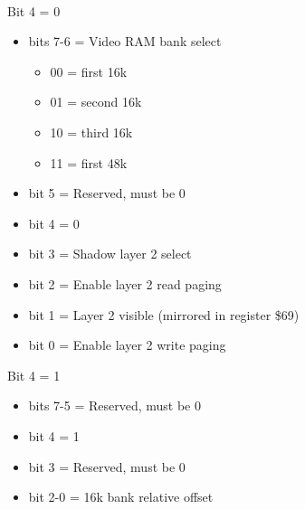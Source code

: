 \\
Bit 4 = 0
\begin{itemize}
\item[] bits 7-6 = Video RAM bank select
  \begin{itemize}
  \item[] 00 = first 16k
  \item[] 01 = second 16k
  \item[] 10 = third 16k
  \item[] 11 = first 48k
  \end{itemize}
\item[] bit 5 = Reserved, must be 0
\item[] bit 4 = 0
\item[] bit 3 = Shadow layer 2 select
\item[] bit 2 = Enable layer 2 read paging
\item[] bit 1 = Layer 2 visible (mirrored in register \$69)
\item[] bit 0 = Enable layer 2 write paging
\end{itemize}
Bit 4 = 1
\begin{itemize}
\item[] bits 7-5 = Reserved, must be 0
\item[] bit 4 = 1
\item[] bit 3 = Reserved, must be 0
\item[] bit 2-0 = 16k bank relative offset
\end{itemize}

